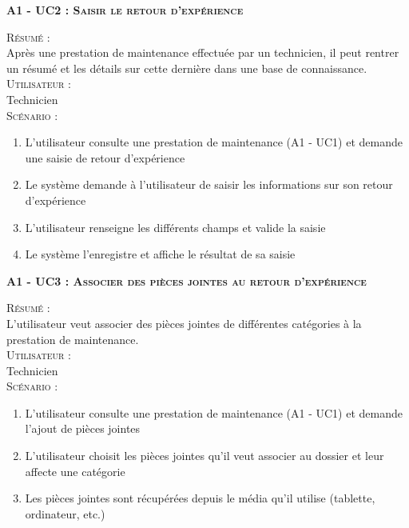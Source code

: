 \noindent\textsc{\bf{A1 - UC2 :} Saisir le retour d’expérience}
\begin{shaded}
\noindent\textsc{Résumé :}\\

Après une prestation de maintenance effectuée par un technicien, il peut rentrer un résumé et les détails sur cette dernière dans une base de connaissance. \\

\noindent\textsc{Utilisateur :} \\

Technicien \\

\noindent\textsc{Scénario :} \\
\begin{enumerate}
    \item L’utilisateur consulte une prestation de maintenance (A1 - UC1) et demande une saisie de retour d’expérience
    \item Le système demande à l’utilisateur de saisir les informations sur son retour d’expérience
    \item L’utilisateur renseigne les différents champs et valide la saisie
    \item Le système l’enregistre et affiche le résultat de sa saisie \\
\end{enumerate}
\end{shaded}
\noindent\textsc{\bf{A1 - UC3 :} Associer des pièces jointes au retour d’expérience}
\begin{shaded}
\noindent\textsc{Résumé :}\\

L’utilisateur veut associer des pièces jointes de différentes catégories à la prestation de maintenance. \\

\noindent\textsc{Utilisateur :} \\

Technicien \\

\noindent\textsc{Scénario :} \\
\begin{enumerate}
    \item L’utilisateur consulte une prestation de maintenance (A1 - UC1) et demande l’ajout de pièces jointes
    \item L’utilisateur choisit les pièces jointes qu’il veut associer au dossier et leur affecte une catégorie
    \item Les pièces jointes sont récupérées depuis le média qu’il utilise (tablette, ordinateur, etc.)
\end{enumerate}

\end{shaded}


